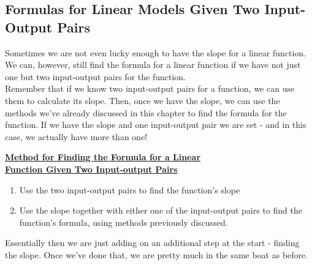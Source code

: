 %
%

\subsection{Formulas for Linear Models Given Two Input-Output Pairs}

Sometimes we are not even lucky enough to have the slope for a linear function. We can, however, still find the formula for a linear function if we have not just one but two input-output pairs for the function.\\

Remember that if we know two input-output pairs for a function, we can use them to calculate its slope. Then, once we have the slope, we can use the methods we’ve already discussed in this chapter to find the formula for the function. If we have the slope and one input-output pair we are set - and in this case, we actually have more than one!

\begin{definition}
	\textbf{\underline{Method for Finding the Formula for a Linear \\ Function Given Two Input-output Pairs}}
	\begin{enumerate}
		\item Use the two input-output pairs to find the function’s slope
		\item Use the slope together with either one of the input-output pairs to find the function’s formula, using methods previously discussed.
	\end{enumerate}
\end{definition}

Essentially then we are just adding on an additional step at the start - finding the slope. Once we’ve done that, we are pretty much in the same boat as before.


